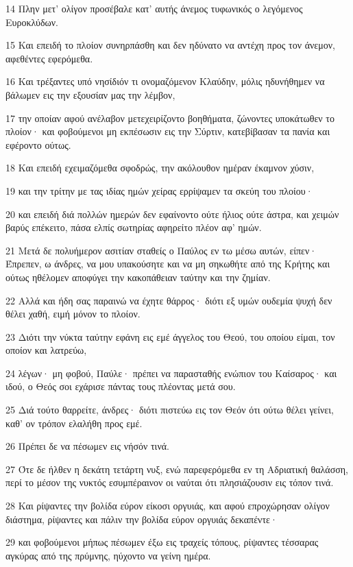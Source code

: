 \par 14 Πλην μετ' ολίγον προσέβαλε κατ' αυτής άνεμος τυφωνικός ο λεγόμενος Ευροκλύδων.
\par 15 Και επειδή το πλοίον συνηρπάσθη και δεν ηδύνατο να αντέχη προς τον άνεμον, αφεθέντες εφερόμεθα.
\par 16 Και τρέξαντες υπό νησίδιόν τι ονομαζόμενον Κλαύδην, μόλις ηδυνήθημεν να βάλωμεν εις την εξουσίαν μας την λέμβον,
\par 17 την οποίαν αφού ανέλαβον μετεχειρίζοντο βοηθήματα, ζώνοντες υποκάτωθεν το πλοίον· και φοβούμενοι μη εκπέσωσιν εις την Σύρτιν, κατεβίβασαν τα πανία και εφέροντο ούτως.
\par 18 Και επειδή εχειμαζόμεθα σφοδρώς, την ακόλουθον ημέραν έκαμνον χύσιν,
\par 19 και την τρίτην με τας ιδίας ημών χείρας ερρίψαμεν τα σκεύη του πλοίου·
\par 20 και επειδή διά πολλών ημερών δεν εφαίνοντο ούτε ήλιος ούτε άστρα, και χειμών βαρύς επέκειτο, πάσα ελπίς σωτηρίας αφηρείτο πλέον αφ' ημών.
\par 21 Μετά δε πολυήμερον ασιτίαν σταθείς ο Παύλος εν τω μέσω αυτών, είπεν· Έπρεπεν, ω άνδρες, να μου υπακούσητε και να μη σηκωθήτε από της Κρήτης και ούτως ηθέλομεν αποφύγει την κακοπάθειαν ταύτην και την ζημίαν.
\par 22 Αλλά και ήδη σας παραινώ να έχητε θάρρος· διότι εξ υμών ουδεμία ψυχή δεν θέλει χαθή, ειμή μόνον το πλοίον.
\par 23 Διότι την νύκτα ταύτην εφάνη εις εμέ άγγελος του Θεού, του οποίου είμαι, τον οποίον και λατρεύω,
\par 24 λέγων· μη φοβού, Παύλε· πρέπει να παρασταθής ενώπιον του Καίσαρος· και ιδού, ο Θεός σοι εχάρισε πάντας τους πλέοντας μετά σου.
\par 25 Διά τούτο θαρρείτε, άνδρες· διότι πιστεύω εις τον Θεόν ότι ούτω θέλει γείνει, καθ' ον τρόπον ελαλήθη προς εμέ.
\par 26 Πρέπει δε να πέσωμεν εις νήσόν τινά.
\par 27 Ότε δε ήλθεν η δεκάτη τετάρτη νυξ, ενώ παρεφερόμεθα εν τη Αδριατική θαλάσση, περί το μέσον της νυκτός εσυμπέραινον οι ναύται ότι πλησιάζουσιν εις τόπον τινά.
\par 28 Και ρίψαντες την βολίδα εύρον είκοσι οργυιάς, και αφού επροχώρησαν ολίγον διάστημα, ρίψαντες και πάλιν την βολίδα εύρον οργυιάς δεκαπέντε·
\par 29 και φοβούμενοι μήπως πέσωμεν έξω εις τραχείς τόπους, ρίψαντες τέσσαρας αγκύρας από της πρύμνης, ηύχοντο να γείνη ημέρα.
